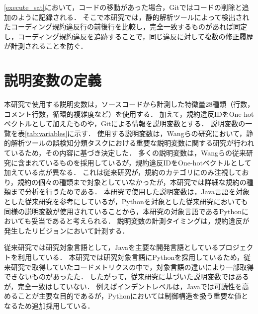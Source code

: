 \documentclass[11pt]{jreport}
\begin{document}
\ref{execute_sat}において，コードの移動があった場合，Gitではコードの削除と追加のように記録される．
そこで本研究では，静的解析ツールによって検出されたコーディング規約違反行の前後行を比較し，完全一致するものがあれば同定し，コーディング規約違反を追跡することで，同じ違反に対して複数の修正履歴が計測されることを防ぐ．

\section{説明変数の定義}

本研究で使用する説明変数は，ソースコードから計測した特徴量28種類（行数，コメント行数，循環的複雑度など）を使用する．
加えて，規約違反IDをOne-hotベクトルとして加えたものや，Gitによる情報を説明変数とする．
説明変数の一覧を表\ref{tab:variables}に示す．
使用する説明変数は，Wangらの研究において，静的解析ツールの誤検知分類タスクにおける重要な説明変数に関する研究が行われているため，その内容に基づき決定した\cite{Wang}．
多くの説明変数は，Wangらの従来研究に含まれているものを採用しているが，規約違反IDをOne-hotベクトルとして加えている点が異なる．
これは従来研究が，規約のカテゴリにのみ注視しており，規約の個々の種類まで対象としていなかったが，本研究では詳細な規約の種類まで分析を行うためである．
本研究で使用した説明変数は，Java言語を対象とした従来研究を参考にしているが，Pythonを対象とした従来研究においても同様の説明変数が使用されていることから，本研究の対象言語であるPythonにおいても妥当であると考えられる\cite{tsiazhkorob2024classification}．
説明変数の計測タイミングは，規約違反が発生したリビジョンにおいて計測する．

従来研究では研究対象言語として，Javaを主要な開発言語としているプロジェクトを利用している．
本研究では研究対象言語にPythonを採用しているため，従来研究で取得していたコードメトリクスの中で，対象言語の違いにより一部取得できないものがあったた．
したがって，従来研究に基づいた説明変数ではあるが，完全一致はしていない．
例えばインデントレベルは，Javaでは可読性を高めることが主要な目的であるが，Pythonにおいては制御構造を扱う重要な値となるため追加採用している．
\end{document}
